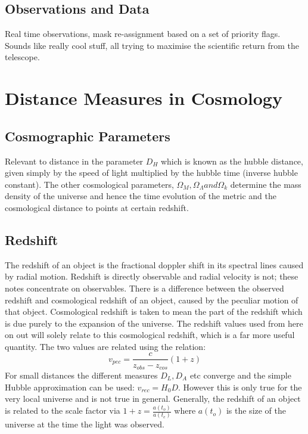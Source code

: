 \documentclass{literature}
\begin{document}
\subsection{Observations and Data}
Real time observations, mask re-assignment based on a set of priority flags. Sounds like really cool stuff, all trying to maximise the scientific return from the telescope. 






\section{Distance Measures in Cosmology}\label{sec:cosmology_distance}
\subsection{Cosmographic Parameters}
Relevant to distance in the parameter $D_{H}$ which is known as the hubble distance, given simply by the speed of light multiplied by the hubble time (inverse hubble constant). The other cosmological parameters, $\Omega_{M}, \Omega_{\Lambda} and \Omega_{k}$ determine the mass density of the universe and hence the time evolution of the metric and the cosmological distance to points at certain redshift.
\subsection{Redshift}\label{subs:redshift}
The redshift of an object is the fractional doppler shift in its spectral lines caused by radial motion. Redshift is directly observable and radial velocity is not; these notes concentrate on observables. There is a difference between the observed redshift and cosmological redshift of an object, caused by the peculiar motion of that object. Cosmological redshift is taken to mean the part of the redshift which is due purely to the expansion of the universe. The redshift values used from here on out will solely relate to this cosmological redshift, which is a far more useful quantity. The two values are related using the relation: 
\begin{equation}
v_{pec} = \frac c{z_{obs} - z_{cos}}{(1 + z)}	
\end{equation}
For small distances the different measures $D_{L}, D_{A}$ etc converge and the simple Hubble approximation can be used: $v_{rec} = H_{0}D$. However this is only true for the very local universe and is not true in general. Generally, the redshift of an object is related to the scale factor via $1 + z = \frac{a(t_{o})}{a(t_{e})}$ where $a(t_{o})$ is the size of the universe at the time the light was observed.
\end{document}
